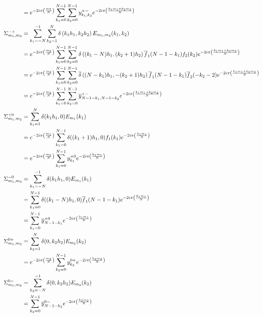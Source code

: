 \begin{align}
  &=e^{-2i\pi\left(\frac{m_1}{N}\right)} \sum_{k_1=0}^{N-1}\sum_{k_2=0}^{N-1} y^{+-}_{k_1,k_2} e^{-2i\pi\left(\frac{k_1m_1+k_2m_2}{N}\right)} \\
\Sigma_{m_1,m_2}^{-+}&=\sum_{k_1=-N}^{-1}\sum_{k_2=1}^{N}\delta\left(k_1h_1,k_2h_2\right)E_{m_1,m_2}(k_1,k_2) \notag\\
  &=e^{-2i\pi\left(\frac{m_2}{N}\right)} \sum_{k_1=0}^{N-1}\sum_{k_2=0}^{N-1} \delta\left((k_1-N)h_1,(k_2+1)h_2\right) \overline{f}_1(N-1-k_1) f_2(k_2) e^{-2i\pi\left(\frac{k_1m_1+k_2m_2}{N}\right)} \notag\\
  &=e^{-2i\pi\left(\frac{m_2}{N}\right)} \sum_{k_1=0}^{N-1}\sum_{k_2=0}^{N-1} \overline{\delta}\left((N-k_1)h_1,-(k_2+1)h_2\right) \overline{f}_1(N-1-k_1) \overline{f}_2(-k_2-2) e^{-2i\pi\left(\frac{k_1m_1+k_2m_2}{N}\right)} \notag\\
  &=e^{-2i\pi\left(\frac{m_2}{N}\right)} \sum_{k_1=0}^{N-1}\sum_{k_2=0}^{N-1} \overline{y}^{+-}_{N-1-k_1,N-1-k_2} e^{-2i\pi\left(\frac{k_1m_1+k_2m_2}{N}\right)} \\
\Sigma_{m_1,m_2}^{+0}&=\sum_{k_1=1}^{N}\delta(k_1h_1,0)E_{m_1}(k_1) \notag\\
  &=e^{-2i\pi\left(\frac{m_1}{N}\right)} \sum_{k_1=0}^{N-1} \delta((k_1+1)h_1,0) f_1(k_1) e^{-2i\pi\left(\frac{k_1m_1}{N}\right)} \notag\\
  &=e^{-2i\pi\left(\frac{m_1}{N}\right)} \sum_{k_1=0}^{N-1} y^{+0}_{k_1} e^{-2i\pi\left(\frac{k_1m_1}{N}\right)}\\
\Sigma_{m_1,m_2}^{-0}&=\sum_{k_1=-N}^{-1}\delta(k_1h_1,0)E_{m_1}(k_1) \notag\\
  &= \sum_{k_1=0}^{N-1} \delta((k_1-N)h_1,0) \overline{f}_1(N-1-k_1) e^{-2i\pi\left(\frac{k_1m_1}{N}\right)}\notag\\
  &= \sum_{k_1=0}^{N-1} \overline{y}^{+0}_{N-1-k_1} e^{-2i\pi\left(\frac{k_1m_1}{N}\right)}\\
\Sigma_{m_1,m_2}^{0+}&=\sum_{k_2=1}^{N}\delta(0,k_2h_2)E_{m_2}(k_2) \notag\\
  &=e^{-2i\pi\left(\frac{m_2}{N}\right)} \sum_{k_2=0}^{N-1} y^{0+}_{k_2} e^{-2i\pi\left(\frac{k_2m_2}{N}\right)}\\
\Sigma_{m_1,m_2}^{0-}&=\sum_{k_2=-N}^{-1}\delta(0,k_2h_2)E_{m_2}(k_2) \notag\\
  &= \sum_{k_2=0}^{N-1} \overline{y}^{0-}_{N-1-k_2} e^{-2i\pi\left(\frac{k_2m_2}{N}\right)}
\end{align}

